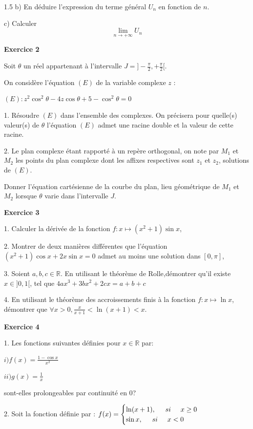 \documentclass[12pt]{article}
\begin{document}
\begin{spacing}{1.5}
b) En déduire l'expression du terme général $U_n$ en fonction de $n$. 

c) Calculer \[\lim_{n\longrightarrow +\infty}U_n\]
 
\medskip\textbf{Exercice 2}
 
 Soit $\theta$ un réel appartenant à l'intervalle $J = ]-\frac{\pi}{2}, + \frac{\pi}{2}[$. 

On considère l'équation $(E)$ de la variable complexe $z$ : 

$(E): z^2\cos^2\theta-4z\cos\theta + 5 - \cos^2\theta = 0$ 

1. Résoudre $(E)$ dans l'ensemble des complexes. On précisera pour quelle(s) valeur(s) de $\theta$ l'équation $(E)$ admet une racine double et la valeur de cette racine. 

2. Le plan complexe étant rapporté à un repère orthogonal, on note par $M_1$ et $M_2$ les 
points du plan complexe dont les affixes respectives sont $z_1$ et $z_2$, solutions de $(E)$. 

Donner l'équation cartésienne de la courbe du plan, lieu géométrique de $M_1$ et $M_2$ lorsque $\theta$ varie dans l'intervalle $J$.

\medskip\textbf{Exercice 3 }
 
 1. Calculer la dérivée de la fonction $f :x\longmapsto (x^2+1)\sin x$,
 
 2. Montrer de deux manières différentes que l'équation $(x^2+1)\cos x+2x\sin x=0$ admet au moins une solution dans $[0,\pi]$,
 
3. Soient $a,b,c\in \mathbb{R}$. En utilisant le théorème de Rolle,démontrer qu'il existe $x\in ]0,1[$, tel que
 $4ax^3+3bx^2+2cx=a+b+c$
 
4. En utilisant le théorème des accroissements finis à la fonction $f:x\longmapsto \ln x$, démontrer que $\forall {x>0}, \frac{x}{x+1}<\ln(x+1)<x$.

\medskip\textbf{Exercice 4}
 
  1. Les fonctions suivantes définies pour $x\in \mathbb{R}$ par:
 
 $i)f(x)=\frac{1-\cos x}{x^2}$ 
 
 $ii)g(x)= \frac{1}{x}$ 
 
 sont-elles prolongeables par continuité en 0?
 
2. Soit la fonction définie par : $f(x)=\begin{cases}
\ln (x+1), \hspace{0,5 cm} si \hspace{0,5 cm} x\geq 0\\
\sin{x}, \hspace{0,5 cm} si\hspace{0,5 cm} x<0
\end{cases}$


\end{spacing}
\end{document}

